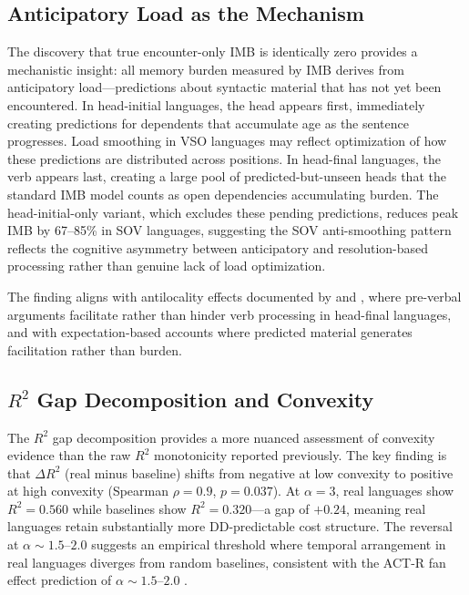 \documentclass[11pt,letterpaper]{article}
\begin{document}
\subsection{Anticipatory Load as the Mechanism}

The discovery that true encounter-only IMB is identically zero provides a mechanistic insight: all memory burden measured by IMB derives from anticipatory load---predictions about syntactic material that has not yet been encountered. In head-initial languages, the head appears first, immediately creating predictions for dependents that accumulate age as the sentence progresses. Load smoothing in VSO languages may reflect optimization of how these predictions are distributed across positions. In head-final languages, the verb appears last, creating a large pool of predicted-but-unseen heads that the standard IMB model counts as open dependencies accumulating burden. The head-initial-only variant, which excludes these pending predictions, reduces peak IMB by 67--85\% in SOV languages, suggesting the SOV anti-smoothing pattern reflects the cognitive asymmetry between anticipatory and resolution-based processing rather than genuine lack of load optimization.

The finding aligns with antilocality effects documented by \citet{Konieczny2000} and \citet{Vasishth2003}, where pre-verbal arguments facilitate rather than hinder verb processing in head-final languages, and with expectation-based accounts \citep{Levy2008} where predicted material generates facilitation rather than burden.

\subsection{$R^2$ Gap Decomposition and Convexity}

The $R^2$ gap decomposition provides a more nuanced assessment of convexity evidence than the raw $R^2$ monotonicity reported previously. The key finding is that $\Delta R^2$ (real minus baseline) shifts from negative at low convexity to positive at high convexity (Spearman $\rho = 0.9$, $p = 0.037$). At $\alpha = 3$, real languages show $R^2 = 0.560$ while baselines show $R^2 = 0.320$---a gap of $+0.24$, meaning real languages retain substantially more DD-predictable cost structure. The reversal at $\alpha \sim 1.5$--$2.0$ suggests an empirical threshold where temporal arrangement in real languages diverges from random baselines, consistent with the ACT-R fan effect prediction of $\alpha \sim 1.5$--$2.0$ \citep{Lewis2005}.
\end{document}
